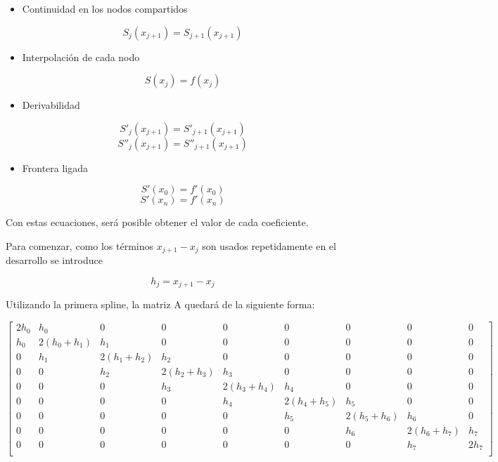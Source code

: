 \begin{itemize}
    \item Continuidad en los nodos compartidos
\end{itemize}
\begin{equation}
    S_j(x_{j+1})=S_{j+1}(x_{j+1})
\end{equation}
\begin{itemize}
    \item Interpolación de cada nodo
\end{itemize}
\begin{equation}
    S(x_j)=f(x_j)
\end{equation}
\begin{itemize}
    \item Derivabilidad 
\end{itemize}
\begin{equation}
    S'_j(x_{j+1})=S'_{j+1}(x_{j+1})
\end{equation}
\begin{equation}
    S''_j(x_{j+1})=S''_{j+1}(x_{j+1})
\end{equation}
\begin{itemize}
    \item Frontera ligada
\end{itemize}
\begin{equation}
    S'(x_0)=f'(x_0)
\end{equation}
\begin{equation}
    S'(x_n)=f'(x_n)
\end{equation}

Con estas ecuaciones, será posible obtener el valor de cada coeficiente.


Para comenzar, como los términos $x_{j+1}-x_j$ son usados repetidamente en el desarrollo se introduce

\begin{equation}
    h_j=x_{j+1}-x_j
\end{equation}
    
Utilizando la primera spline, la matriz A quedará de la siguiente forma:

\begin{equation}
    \begin{bmatrix}
    2h_0 & h_0 & 0 & 0 & 0 & 0 & 0 & 0 & 0 \\
    h_0 & 2(h_0+h_1) & h_1 & 0 & 0 & 0 & 0 & 0 & 0 \\
    0 & h_1 & 2(h_1+h_2) & h_2 & 0 & 0 & 0 & 0 & 0 \\
    0 & 0 & h_2 & 2(h_2+h_3) & h_3 & 0 & 0 & 0 & 0 \\
    0 & 0 & 0 & h_3 & 2(h_3+h_4) & h_4 & 0 & 0 & 0 \\
    0 & 0 & 0 & 0 & h_4 & 2(h_4+h_5) & h_5 & 0 & 0 \\
    0 & 0 & 0 & 0 & 0 & h_5 & 2(h_5+h_6) & h_6 & 0 \\
    0 & 0 & 0 & 0 & 0 & 0 & h_6 & 2(h_6+h_7) & h_7 \\
    0 & 0 & 0 & 0 & 0 & 0 & 0 & h_7 & 2h_7 \\
    \end{bmatrix}
\end{equation}

